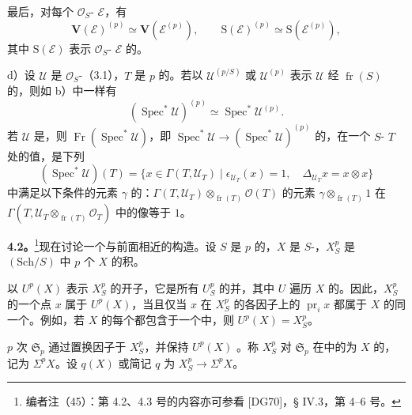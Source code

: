 最后，对每个 $\mathcal O_S$- $\mathcal E$，有
\[
\mathbf V(\mathcal E)^{(p)}\simeq\mathbf V(\mathcal E^{(p)}),\qquad
\mathrm S(\mathcal E)^{(p)}\simeq\mathrm S(\mathcal E^{(p)}),
\]
其中 $\mathrm S(\mathcal E)$ 表示 $\mathcal O_S$- $\mathcal E$ 的。

 d）设 $\mathcal U$ 是 $\mathcal O_S$-（3.1），$T$ 是 $p$ 的。若以 $\mathcal U^{(p/S)}$ 或 $\mathcal U^{(p)}$ 表示 $\mathcal U$ 经 $\operatorname{fr}(S)$ 的，则如 b）中一样有
\[
(\operatorname{Spec}^*\mathcal U)^{(p)}\simeq\operatorname{Spec}^*\mathcal U^{(p)}.
\]
若 $\mathcal U$ 是，则 $\operatorname{Fr}(\operatorname{Spec}^*\mathcal U)$，即 $\operatorname{Spec}^*\mathcal U\to(\operatorname{Spec}^*\mathcal U)^{(p)}$ 的，在一个 $S$- $T$ 处的值，是下列
\[
(\operatorname{Spec}^*\mathcal U)(T)=\{x\in\Gamma(T,\mathcal U_T)\mid\epsilon_{\mathcal U_T}(x)=1,\quad\Delta_{\mathcal U_T}x=x\otimes x\}
\]
中满足以下条件的元素 $\gamma$ 的：$\Gamma(T,\mathcal U_T)\otimes_{\operatorname{fr}(T)}\mathcal O(T)$ 的元素 $\gamma\otimes_{\operatorname{fr}(T)}1$ 在 $\Gamma(T,\mathcal U_T\otimes_{\operatorname{fr}(T)}\mathcal O_T)$ 中的像等于 $1$。

\textbf{4.2。}\footnote{编者注（45）：第 4.2、4.3 号的内容亦可参看 [DG70]，§ IV.3，第 4–6 号。}现在讨论一个与前面相近的构造。设 $S$ 是 $p$ 的，$X$ 是 $S$-，$X_S^p$ 是 $(\mathrm{Sch}/S)$ 中 $p$ 个 $X$ 的积。

以 $U^p(X)$ 表示 $X_S^p$ 的开子，它是所有 $U_S^p$ 的并，其中 $U$ 遍历 $X$ 的。因此，$X_S^p$ 的一个点 $x$ 属于 $U^p(X)$，当且仅当 $x$ 在 $X_S^p$ 的各因子上的 $\operatorname{pr}_i x$ 都属于 $X$ 的同一个。例如，若 $X$ 的每个都包含于一个中，则 $U^p(X)=X_S^p$。

$p$ 次 $\mathfrak S_p$ 通过置换因子于 $X_S^p$，并保持 $U^p(X)$ 。称 $X_S^p$ 对 $\mathfrak S_p$ 在中的为 $X$ 的，记为 $\Sigma^p X$。设 $q(X)$ 或简记 $q$ 为 $X_S^p\to\Sigma^p X$。

